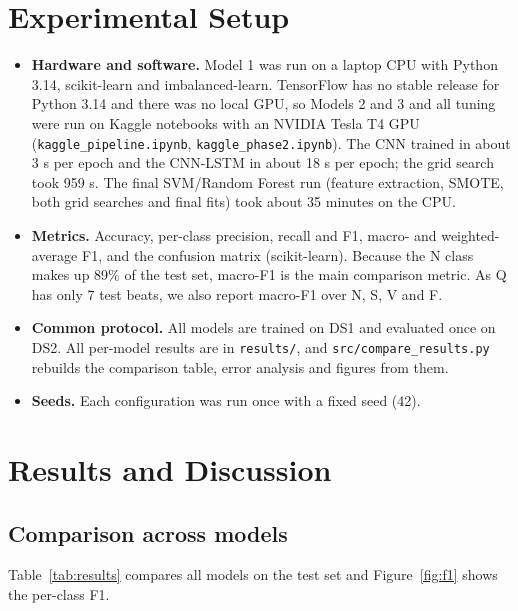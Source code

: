 \documentclass[11pt,a4paper]{article}
\begin{document}
\section{Experimental Setup}
\begin{itemize}
\item \textbf{Hardware and software.} Model 1 was run on a laptop CPU with Python 3.14, scikit-learn and imbalanced-learn. TensorFlow has no stable release for Python 3.14 and there was no local GPU, so Models 2 and 3 and all tuning were run on Kaggle notebooks with an NVIDIA Tesla T4 GPU (\texttt{kaggle\_pipeline.ipynb}, \texttt{kaggle\_phase2.ipynb}). The CNN trained in about 3 s per epoch and the CNN-LSTM in about 18 s per epoch; the grid search took 959 s. The final SVM/Random Forest run (feature extraction, SMOTE, both grid searches and final fits) took about 35 minutes on the CPU.
\item \textbf{Metrics.} Accuracy, per-class precision, recall and F1, macro- and weighted-average F1, and the confusion matrix (scikit-learn). Because the N class makes up 89\% of the test set, macro-F1 is the main comparison metric. As Q has only 7 test beats, we also report macro-F1 over N, S, V and F.
\item \textbf{Common protocol.} All models are trained on DS1 and evaluated once on DS2. All per-model results are in \texttt{results/}, and \texttt{src/compare\_results.py} rebuilds the comparison table, error analysis and figures from them.
\item \textbf{Seeds.} Each configuration was run once with a fixed seed (42).
\end{itemize}

\section{Results and Discussion}\label{sec:results}

\subsection{Comparison across models}
Table~\ref{tab:results} compares all models on the test set and Figure~\ref{fig:f1} shows the per-class F1.
\end{document}
